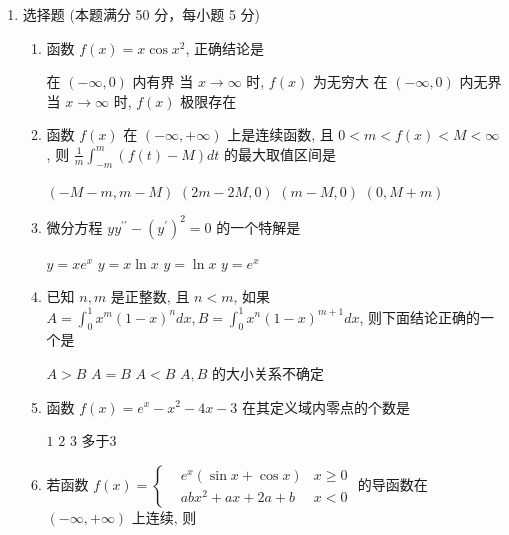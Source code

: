 

\begin{enumerate}
	\item
	选择题 (本题满分 50 分，每小题 5 分)
	\begin{enumerate}
		\item
		函数 $f(x)=x \cos x^{2}$, 正确结论是  
		
	\fourchoices
	{在 $(-\infty, 0)$ 内有界}
	{当 $x \rightarrow \infty$ 时, $f(x)$ 为无穷大}
	{在 $(-\infty, 0)$ 内无界}
	{当 $x \rightarrow \infty$ 时, $f(x)$ 极限存在}
	
\item 
函数 $f(x)$ 在 $(-\infty,+\infty)$ 上是连续函数, 且 $0<m<f(x)<M<\infty$, 则 $\frac{1}{m} \int_{-m}^{m}(f(t)-M) d t$ 的最大取值区间是 


\fourchoices
{$(-M-m, m-M)$}
{$(2 m-2 M, 0)$}
{$(m-M, 0)$}
{$(0, M+m)$}


\item 
微分方程 $y y^{\prime \prime}-\left(y^{\prime}\right)^{2}=0$ 的一个特解是  


\fourchoices
{$y=x e^{x}$}
{$y=x \ln x$}
{$y=\ln x$}
{$y=e^{x}$}

\item 
已知 $n, m$ 是正整数, 且 $n<m$, 如果 $A=\int_{0}^{1} x^{m}(1-x)^{n} d x, B=\int_{0}^{1} x^{n}(1-x)^{m+1} d x$, 则下面结论正确的一个是  


\fourchoices
{$A>B$}
{$A=B$}
{$A<B$}
{$A, B$ 的大小关系不确定}

\item 
函数 $f(x)=e^{x}-x^{2}-4 x-3$ 在其定义域内零点的个数是  



\fourchoices
{$ 1 $}
{$ 2 $}
{$ 3 $}
{多于$  3 $}

\item 
若函数 $f(x)= \left\{\begin{aligned} &e^{x}(\sin x+\cos x) &   x \geqslant 0 \\ &a b x^{2}+a x+2 a+b &   x<0\end{aligned}\right.$ 的导函数在 $(-\infty,+\infty)$ 上连续, 则  



\end{enumerate}
\end{enumerate}
